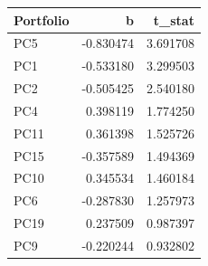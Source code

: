 \begin{tabular}{lrr}
\toprule
Portfolio & b & t_stat \\
\midrule
PC5 & -0.830474 & 3.691708 \\
PC1 & -0.533180 & 3.299503 \\
PC2 & -0.505425 & 2.540180 \\
PC4 & 0.398119 & 1.774250 \\
PC11 & 0.361398 & 1.525726 \\
PC15 & -0.357589 & 1.494369 \\
PC10 & 0.345534 & 1.460184 \\
PC6 & -0.287830 & 1.257973 \\
PC19 & 0.237509 & 0.987397 \\
PC9 & -0.220244 & 0.932802 \\
\bottomrule
\end{tabular}
